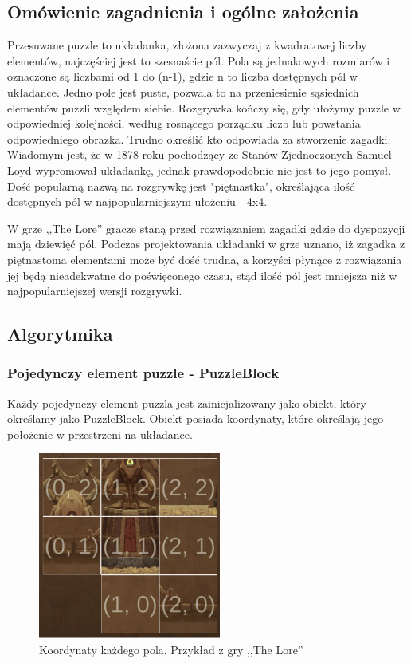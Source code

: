 \documentclass[oneside,polski,logo]{amuthesis}
\begin{document}
\subsection{Omówienie zagadnienia i ogólne założenia}
\par Przesuwane puzzle to układanka, złożona zazwyczaj z kwadratowej liczby elementów, najczęściej jest to szesnaście pól. Pola są jednakowych rozmiarów i oznaczone są liczbami od 1 do (n-1), gdzie n to liczba dostępnych pól w układance. Jedno pole jest puste, pozwala to na przeniesienie sąsiednich elementów puzzli względem siebie. Rozgrywka kończy się, gdy ułożymy puzzle w odpowiedniej kolejności, według rosnącego porządku liczb lub powstania odpowiedniego obrazka. Trudno określić kto odpowiada za stworzenie zagadki. Wiadomym jest, że w 1878 roku pochodzący ze Stanów Zjednoczonych Samuel Loyd wypromował układankę, jednak prawdopodobnie nie jest to jego pomysł. Dość popularną nazwą na rozgrywkę jest "piętnastka", określająca ilość dostępnych pól w najpopularniejszym ułożeniu - 4x4.  \cite{przesuwane_puzzle}

W grze ,,The Lore'' gracze staną przed rozwiązaniem zagadki gdzie do dyspozycji mają dziewięć pól. Podczas projektowania układanki w grze uznano, iż zagadka z piętnastoma elementami może być dość trudna, a korzyści płynące z rozwiązania jej będą nieadekwatne do poświęconego czasu, stąd ilość pól jest mniejsza niż w najpopularniejszej wersji rozgrywki.
\subsection{Algorytmika}
\subsubsection{Pojedynczy element puzzle - PuzzleBlock}

\par Każdy pojedynczy element puzzla jest zainicjalizowany jako obiekt, który określamy jako PuzzleBlock. Obiekt posiada koordynaty, które określają jego położenie w przestrzeni na układance.

\begin{figure}[h]
	\centering
	\includegraphics[width=6cm]{images/tyrek/coord_puzzle.png}
	\caption{Koordynaty każdego pola. Przykład z gry ,,The Lore''}
\end{figure}
\end{document}
